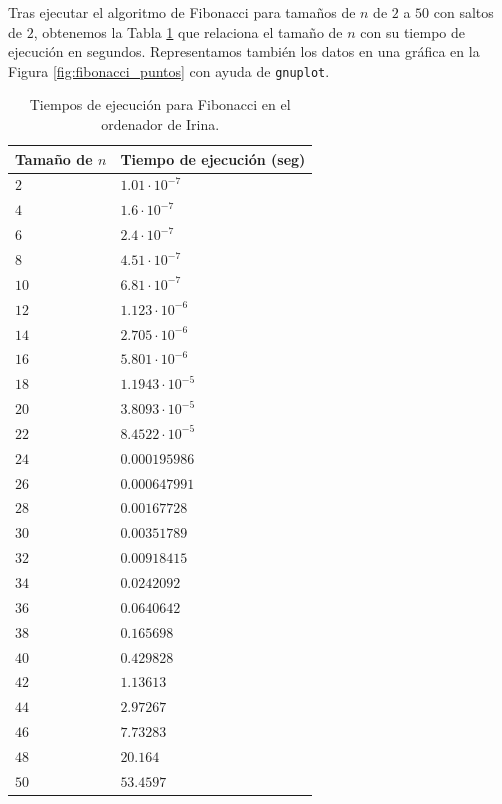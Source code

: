 \documentclass[12pt]{article}
\begin{document}
    Tras ejecutar el algoritmo de Fibonacci para tamaños de $n$ de $2$ a $50$ con saltos de $2$, 
    obtenemos la Tabla \ref{tab:fibonacci_tiempos} que relaciona el tamaño de $n$ con su tiempo de ejecución en segundos. Representamos también los datos en una gráfica en la Figura \ref{fig:fibonacci_puntos} con ayuda de \verb|gnuplot|.
    \begin{table}
        \centering
        \begin{tabular}{|l|l|}
            \hline
            Tamaño de $n$ & Tiempo de ejecución (seg) \\
            \hline
            $2$ & $1.01\cdot 10^{-7}$ \\
            $4$ & $1.6\cdot 10^{-7}$ \\
            $6$ & $2.4\cdot 10^{-7}$ \\
            $8$ & $4.51\cdot 10^{-7}$ \\
            $10$ & $6.81\cdot 10^{-7}$ \\
            $12$ & $1.123\cdot 10^{-6}$ \\
            $14$ & $2.705\cdot 10^{-6}$ \\
            $16$ & $5.801\cdot 10^{-6}$ \\
            $18$ & $1.1943\cdot 10^{-5}$ \\
            $20$ & $3.8093\cdot 10^{-5}$ \\
            $22$ & $8.4522\cdot 10^{-5}$ \\
            $24$ & $0.000195986$ \\
            $26$ & $0.000647991$ \\
            $28$ & $0.00167728$ \\
            $30$ & $0.00351789$ \\
            $32$ & $0.00918415$ \\
            $34$ & $0.0242092$ \\
            $36$ & $0.0640642$ \\
            $38$ & $0.165698$ \\
            $40$ & $0.429828$ \\
            $42$ & $1.13613$ \\
            $44$ & $2.97267$ \\
            $46$ & $7.73283$ \\
            $48$ & $20.164$ \\
            $50$ & $53.4597$ \\
            \hline
        \end{tabular}
        \caption{Tiempos de ejecución para Fibonacci en el ordenador de Irina.}
        \label{tab:fibonacci_tiempos}
    \end{table}
\end{document}
